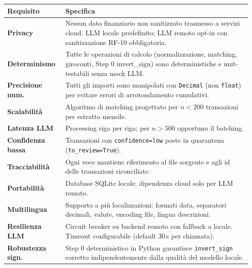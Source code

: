 \documentclass[11pt, a4paper]{article}
\begin{document}
\begin{longtable}{@{}L{3.5cm} L{10cm}@{}}
\toprule
\textbf{Requisito} & \textbf{Specifica} \\
\midrule
\endhead
\textbf{Privacy}          & Nessun dato finanziario non sanitizzato trasmesso a servizi cloud.
                            LLM locale predefinito; LLM remoto opt-in con sanitizzazione RF-10
                            obbligatoria. \\[0.5em]
\textbf{Determinismo}     & Tutte le operazioni di calcolo (normalizzazione, matching,
                            giroconti, Step 0 invert\_sign) sono deterministiche e
                            unit-testabili senza mock LLM. \\[0.5em]
\textbf{Precisione num.}  & Tutti gli importi sono manipolati con \texttt{Decimal}
                            (non \texttt{float}) per evitare errori di arrotondamento
                            cumulativi. \\[0.5em]
\textbf{Scalabilità}      & Algoritmo di matching progettato per $n < 200$ transazioni
                            per estratto mensile. \\[0.5em]
\textbf{Latenza LLM}      & Processing riga per riga; per $n > 500$ opportuno il batching. \\[0.5em]
\textbf{Confidenza bassa} & Transazioni con \texttt{confidence=low} poste in quarantena
                            (\texttt{to\_review=True}). \\[0.5em]
\textbf{Tracciabilità}    & Ogni voce mantiene riferimento al file sorgente e agli id
                            delle transazioni riconciliate. \\[0.5em]
\textbf{Portabilità}      & Database SQLite locale; dipendenza cloud solo per LLM remoto. \\[0.5em]
\textbf{Multilingua}      & Supporto a più localizzazioni: formati data, separatori decimali,
                            valute, encoding file, lingua descrizioni. \\[0.5em]
\textbf{Resilienza LLM}   & Circuit breaker su backend remoto con fallback a locale.
                            Timeout configurabile (default 30\,s per chiamata). \\[0.5em]
\textbf{Robustezza sign.} & Step 0 deterministico in Python garantisce \texttt{invert\_sign}
                            corretto indipendentemente dalla qualità del modello locale. \\
\bottomrule
\end{longtable}
\end{document}
